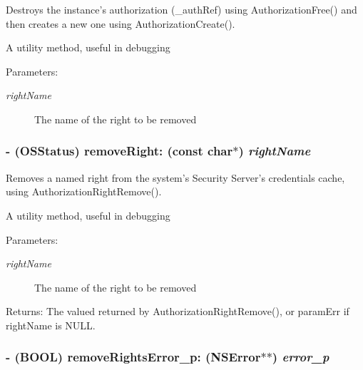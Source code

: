 Destroys the instance's authorization (\_\-authRef) using AuthorizationFree() and then creates a new one using AuthorizationCreate(). 

A utility method, useful in debugging \begin{Desc}
\item[Parameters:]
\begin{description}
\item[{\em rightName}]The name of the right to be removed \end{description}
\end{Desc}
\hypertarget{class_s_s_y_authorized_task_master_3d824456e1398ac9d64026f4b35b183b}{
\subsubsection[{removeRight:}]{\setlength{\rightskip}{0pt plus 5cm}- (OSStatus) removeRight: (const char$\ast$) {\em rightName}}}
\label{class_s_s_y_authorized_task_master_3d824456e1398ac9d64026f4b35b183b}


Removes a named right from the system's Security Server's credentials cache, using AuthorizationRightRemove(). 

A utility method, useful in debugging \begin{Desc}
\item[Parameters:]
\begin{description}
\item[{\em rightName}]The name of the right to be removed \end{description}
\end{Desc}
\begin{Desc}
\item[Returns:]The valued returned by AuthorizationRightRemove(), or paramErr if rightName is NULL. \end{Desc}
\hypertarget{class_s_s_y_authorized_task_master_91bec7ba1991e2f738babb707303a7e0}{
\subsubsection[{removeRightsError\_\-p:}]{\setlength{\rightskip}{0pt plus 5cm}- (BOOL) removeRightsError\_\-p: (NSError$\ast$$\ast$) {\em error\_\-p}}}
\label{class_s_s_y_authorized_task_master_91bec7ba1991e2f738babb707303a7e0}


